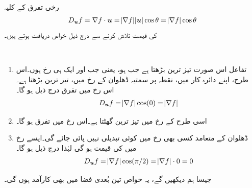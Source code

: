 رخی تفرق کے کلیہ
\begin{align*}
D_{{\boldsymbol{u}}}f=\nabla f\cdot{\boldsymbol{u}}=\abs{\nabla f}\abs{{\boldsymbol{u}}}\cos\theta=\abs{\nabla f}\cos\theta
\end{align*}
کی قیمت  تلاش  کرنے سے درج ذیل خواص   دریافت ہوتے ہیں۔

\\
\begin{enumerate}[1.]
\item
تفاعل  اس صورت تیز ترین بڑھتا ہے جب  ہو، یعنی جب  اور  ایک ہی رخ ہوں۔اس طرح، اپنے دائرہ کار میں، نقطہ  پر  سمتیہ ڈھلوان  کے رخ میں،    تیز ترین بڑھتا ہے۔ اس رخ میں  تفرق درج ذیل ہو گا۔
\begin{align*}
D_{{\boldsymbol{u}}}f=\abs{\nabla f}\cos(0)=\abs{\nabla f}
\end{align*}
\item
اسی طرح   کے رخ میں     تیز ترین  گھٹتا ہے۔اس رخ میں  تفرق  ہو گا۔
\item
ڈھلوان کے متعامد کسی بھی رخ    میں کوئی تبدیلی نہیں پائی جائے گی۔ایسے رخ  میں  کی قیمت  ہو گی  لہٰذا درج ذیل ہو گا۔
\begin{align*}
D_{{\boldsymbol{u}}}f=\abs{\nabla f}\cos(\pi/2)=\abs{\nabla f}\cdot 0 =0
\end{align*}
\end{enumerate}

جیسا ہم دیکھیں گے، یہ خواص تین بُعدی فضا میں بھی کارآمد  ہوں گی۔

